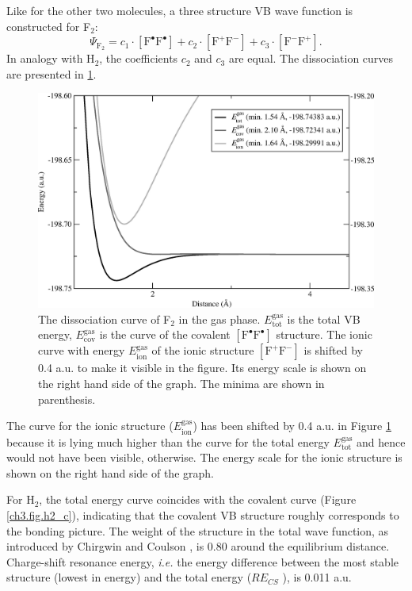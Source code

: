 Like for the other two molecules, a three structure VB wave function is constructed for F$_2$:
\begin{equation}
\nonumber
\Psi_{\mathrm{F_2}} = c_1\cdot [\mathrm{F}^\bullet \mathrm{F}^\bullet] + c_2 \cdot [\mathrm{F}^{+}\mathrm{F}^{-}] + c_3 \cdot [\mathrm{F}^{-}\mathrm{F}^{+}]. 
\end{equation}
In analogy with H$_2$, the coefficients $c_2$ and $c_3$ are equal. The dissociation curves are presented in \ref{ch3.fig.f2_c}.
\begin{figure}[hbtp]
\begin{center}
\includegraphics[scale=0.6]{dissociation/figures/f2_g.eps}
\end{center}
\caption{The dissociation curve of F$_2$ in the gas phase. $E_\mathrm{tot}^\mathrm{gas}$ is the total VB energy, $E_\mathrm{cov}^\mathrm{gas}$ is the curve of the covalent $[\mathrm{F^\bullet F^\bullet}]$ structure. The ionic curve with energy $E_\mathrm{ion}^\mathrm{gas}$ of the ionic structure  $[\mathrm{F}^{+}\mathrm{F}^{-}]$ is shifted by 0.4 a.u. to make it visible in the figure. Its energy scale is shown on the right hand side of the graph. The minima are shown in parenthesis.}
\label{ch3.fig.f2_c}
\end{figure}
The curve for the ionic structure ($E_\mathrm{ion}^\mathrm{gas}$) has been shifted by 0.4 a.u. in Figure \ref{ch3.fig.f2_c} because it is lying much higher than the curve for the total energy $E_\mathrm{tot}^\mathrm{gas}$ and hence would not have been visible, otherwise. The energy scale for the ionic structure is shown on the right hand side of the graph.

For H$_2$, the total energy curve coincides with the covalent curve (Figure \ref{ch3.fig.h2_c}), indicating that the covalent VB structure roughly corresponds to the bonding picture. The weight of the structure in the total wave function, as introduced by Chirgwin and Coulson \cite{chirgwin}, is 0.80 around the equilibrium distance. Charge-shift resonance energy, \textit{i.e.} the energy difference between the most stable structure (lowest in energy) and the total energy ($RE_{CS}$ \cite{cs1}), is 0.011 a.u. 


